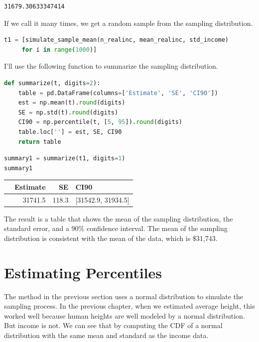 \begin{lstlisting}[]
31679.30633347414
\end{lstlisting}

If we call it many times, we get a random sample from the sampling
distribution.

\begin{lstlisting}[language=Python]
t1 = [simulate_sample_mean(n_realinc, mean_realinc, std_income)
     for i in range(1000)]
\end{lstlisting}

I'll use the following function to summarize the sampling distribution.

\begin{lstlisting}[language=Python]
def summarize(t, digits=2):
    table = pd.DataFrame(columns=['Estimate', 'SE', 'CI90'])
    est = np.mean(t).round(digits)
    SE = np.std(t).round(digits)
    CI90 = np.percentile(t, [5, 95]).round(digits)
    table.loc[''] = est, SE, CI90
    return table
\end{lstlisting}

\begin{lstlisting}[language=Python]
summary1 = summarize(t1, digits=1)
summary1
\end{lstlisting}

\begin{tabular}{lrrl}
\toprule
{} &  Estimate &     SE &                CI90 \\
\midrule
{} &   31741.5 &  118.3 &  [31542.9, 31934.5] \\
\bottomrule
\end{tabular}

The result is a table that shows the mean of the sampling distribution,
the standard error, and a 90\% confidence interval. The mean of the
sampling distribution is consistent with the mean of the data, which is
\$31,743.

\hypertarget{estimating-percentiles}{%
\section{Estimating Percentiles}\label{estimating-percentiles}}

The method in the previous section uses a normal distribution to
simulate the sampling process. In the previous chapter, when we
estimated average height, this worked well because human heights are
well modeled by a normal distribution. But income is not. We can see
that by computing the CDF of a normal distribution with the same mean
and standard as the income data.

